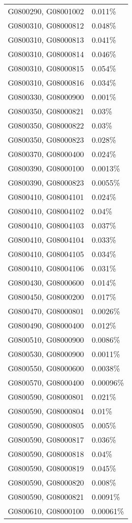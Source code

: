 \begin{longtable}[]{@{}ll@{}}
G0800290, G08001002 & 0.011\% \\
G0800310, G08000812 & 0.048\% \\
G0800310, G08000813 & 0.041\% \\
G0800310, G08000814 & 0.046\% \\
G0800310, G08000815 & 0.054\% \\
G0800310, G08000816 & 0.034\% \\
G0800330, G08000900 & 0.001\% \\
G0800350, G08000821 & 0.03\% \\
G0800350, G08000822 & 0.03\% \\
G0800350, G08000823 & 0.028\% \\
G0800370, G08000400 & 0.024\% \\
G0800390, G08000100 & 0.0013\% \\
G0800390, G08000823 & 0.0055\% \\
G0800410, G08004101 & 0.024\% \\
G0800410, G08004102 & 0.04\% \\
G0800410, G08004103 & 0.037\% \\
G0800410, G08004104 & 0.033\% \\
G0800410, G08004105 & 0.034\% \\
G0800410, G08004106 & 0.031\% \\
G0800430, G08000600 & 0.014\% \\
G0800450, G08000200 & 0.017\% \\
G0800470, G08000801 & 0.0026\% \\
G0800490, G08000400 & 0.012\% \\
G0800510, G08000900 & 0.0086\% \\
G0800530, G08000900 & 0.0011\% \\
G0800550, G08000600 & 0.0038\% \\
G0800570, G08000400 & 0.00096\% \\
G0800590, G08000801 & 0.021\% \\
G0800590, G08000804 & 0.01\% \\
G0800590, G08000805 & 0.005\% \\
G0800590, G08000817 & 0.036\% \\
G0800590, G08000818 & 0.04\% \\
G0800590, G08000819 & 0.045\% \\
G0800590, G08000820 & 0.008\% \\
G0800590, G08000821 & 0.0091\% \\
G0800610, G08000100 & 0.00061\% \\

\end{longtable}
